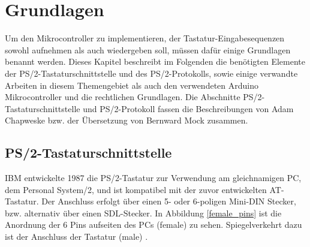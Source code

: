 \chapter{Grundlagen}
\label{grundlagen}
Um den Mikrocontroller zu implementieren, der Tastatur-Eingabesequenzen sowohl aufnehmen als auch wiedergeben soll, müssen dafür einige Grundlagen benannt werden. Dieses Kapitel beschreibt im Folgenden die benötigten Elemente der PS/2-Tastaturschnittstelle und des PS/2-Protokolls, sowie einige verwandte Arbeiten in diesem Themengebiet als auch den verwendeten Arduino Mikrocontroller und die rechtlichen Grundlagen. Die Abschnitte PS/2-Tastaturschnittstelle und PS/2-Protokoll fassen die Beschreibungen von Adam Chapweske \cite{chapweske} bzw. der Übersetzung von Bernward Mock \cite{mock} zusammen.



\section{PS/2-Tastaturschnittstelle}
IBM entwickelte 1987 die PS/2-Tastatur zur Verwendung am gleichnamigen PC, dem Personal System/2, und ist kompatibel mit der zuvor entwickelten AT-Tastatur. Der Anschluss erfolgt über einen 5- oder 6-poligen Mini-DIN Stecker, bzw. alternativ über einen SDL-Stecker. In Abbildung \ref{female_pins} \cite{female_pins} ist die Anordnung der 6 Pins aufseiten des PCs (female) zu sehen. Spiegelverkehrt dazu ist der Anschluss der Tastatur (male) \cite{chapweske} \cite{mock}.

